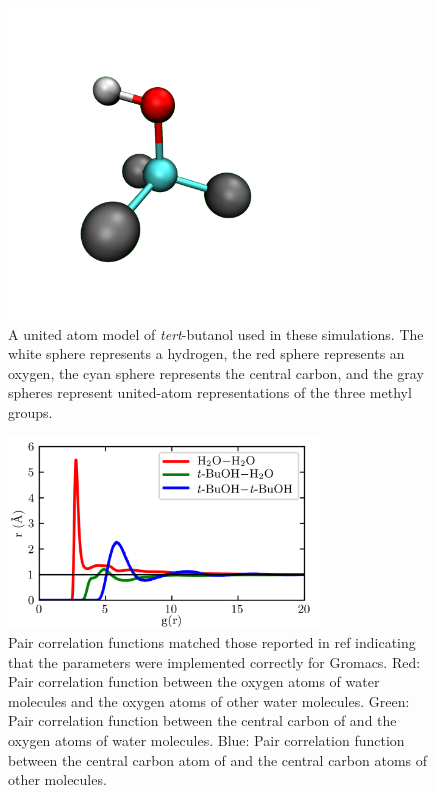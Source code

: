 \begin{figure}
    \center
    \includegraphics[width=3.25in]{figures-helix/tba.png}
    \caption{
        A united atom model of \emph{tert}-butanol used in these simulations. 
        The white sphere represents a hydrogen, the red sphere represents an oxygen, the cyan sphere represents the central carbon, and the gray spheres represent united-atom representations of the three methyl groups.
    }
    \label{fig:helix-tba}
\end{figure}

\begin{figure}
    \center
    \includegraphics[width=3.25in]{figures-helix/rdfs.png}
    \caption{
        Pair correlation functions matched those reported in ref  indicating that the \tba{} parameters were implemented correctly for Gromacs. 
        Red: Pair correlation function between the oxygen atoms of water molecules and the oxygen atoms of other water molecules. 
        Green: Pair correlation function between the central carbon of \tba{} and the oxygen atoms of water molecules. 
        Blue: Pair correlation function between the central carbon atom of \tba{} and the central carbon atoms of other \tba{} molecules. 
    }
    \label{fig:helix-rdfs}
\end{figure}

